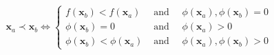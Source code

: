 \begin{equation}
\mathbf{x}_{a} \prec \mathbf{x}_{b}
\Leftrightarrow\left\{
\begin{array}{ll}
{f\left(\mathbf{x}_{b}\right)<f\left(\mathbf{x}_{a}\right)} & {\text { and } \quad \phi\left(\mathbf{x}_{a}\right), \phi\left(\mathbf{x}_{b}\right)=0} \\
{\phi\left(\mathbf{x}_{b}\right)=0} & {\text { and } \quad \phi\left(\mathbf{x}_{a}\right)>0} \\
{\phi\left(\mathbf{x}_{b}\right)<\phi\left(\mathbf{x}_{a}\right)} & {\text { and } \quad \phi\left(\mathbf{x}_{a}\right), \phi\left(\mathbf{x}_{b}\right)>0}
\end{array}\right.
\label{feas}
\end{equation}